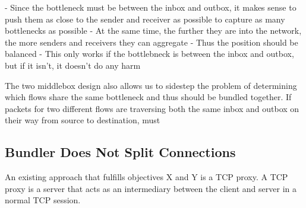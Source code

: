 {- Since the bottleneck must be between the inbox and outbox, it makes sense to push them as 
close to the sender and receiver as possible to capture as many bottlenecks as possible
- At the same time, the further they are into the network, the more senders and receivers they
can aggregate
- Thus the position should be balanced
- This only works if the bottlebneck is between the inbox and outbox, but if it isn't, it doesn't do any harm

The two middlebox design also allows us to sidestep the problem of determining which flows share
the same bottleneck and thus should be bundled together.  If packets for two different flows are traversing
both the same inbox and outbox on their way from source to destination, 
must 
}

\subsection{Bundler Does Not Split Connections}
\label{s:design:split}

An existing approach that fulfills objectives X and Y is a TCP proxy. 
A TCP proxy is a server that acts as an intermediary between the client and server in a normal 
TCP session. 


